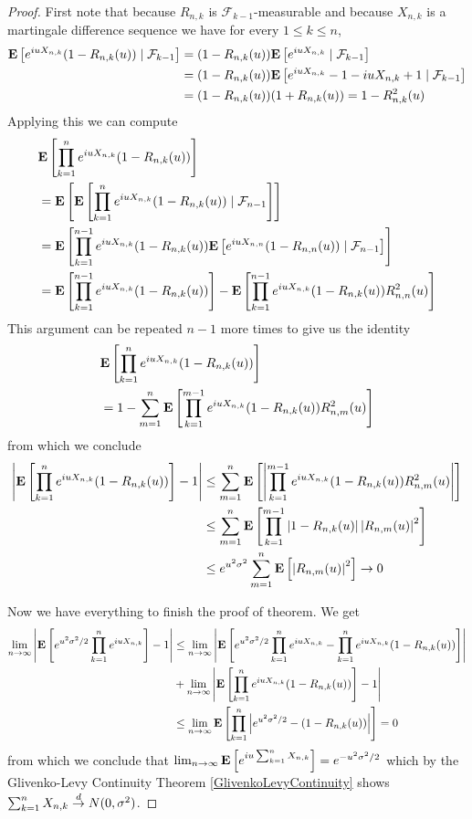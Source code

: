\begin{proof}
First note that because $R_{n,k}$ is $\mathcal{F}_{k-1}$-measurable and because $X_{n,k}$ is a martingale difference sequence we have for every $1 \leq k \leq n$,
\begin{align*}
\cexpectationlong{\mathcal{F}_{k-1}}{e^{iuX_{n,k}} (1 - R_{n,k}(u))} &=
(1 - R_{n,k}(u))\cexpectationlong{\mathcal{F}_{k-1}}{e^{iuX_{n,k}}} \\
&=(1 - R_{n,k}(u))\cexpectationlong{\mathcal{F}_{k-1}}{e^{iuX_{n,k}} -1 -iuX_{n,k} + 1} \\
&= (1 - R_{n,k}(u)) (1 + R_{n,k}(u)) = 1 - R_{n,k}^2(u)
\end{align*}
Applying this we can compute
\begin{align*}
&\expectation{\prod_{k=1}^n e^{iuX_{n,k}} (1 - R_{n,k}(u)) }\\
&=\expectation{\cexpectationlong{\mathcal{F}_{n-1}}{\prod_{k=1}^n e^{iuX_{n,k}} (1 - R_{n,k}(u)) }} \\
&=\expectation{\prod_{k=1}^{n-1} e^{iuX_{n,k}} (1 - R_{n,k}(u))\cexpectationlong{\mathcal{F}_{n-1}}{ e^{iuX_{n,n}} (1 - R_{n,n}(u))}} \\
&=\expectation{\prod_{k=1}^{n-1} e^{iuX_{n,k}} (1 - R_{n,k}(u))} - \expectation{\prod_{k=1}^{n-1} e^{iuX_{n,k}} (1 - R_{n,k}(u)) R^2_{n,n}(u)} 
\end{align*}
This argument can be repeated $n-1$ more times to give us the identity
\begin{align*}
&\expectation{\prod_{k=1}^n e^{iuX_{n,k}} (1 - R_{n,k}(u)) }\\
&=1 - \sum_{m=1}^n \expectation{\prod_{k=1}^{m-1} e^{iuX_{n,k}} (1 - R_{n,k}(u)) R^2_{n,m}(u)} 
\end{align*}
from which we conclude 
\begin{align*}
\abs{\expectation{\prod_{k=1}^n e^{iuX_{n,k}} (1 - R_{n,k}(u)) } - 1} 
&\leq \sum_{m=1}^n \expectation{\abs{\prod_{k=1}^{m-1} e^{iuX_{n,k}} (1 - R_{n,k}(u)) R^2_{n,m}(u)}} \\
&\leq \sum_{m=1}^n \expectation{\prod_{k=1}^{m-1} \abs{ 1 - R_{n,k}(u)} \abs{R_{n,m}(u)}^2}  \\
&\leq e^{u^2\sigma^2} \sum_{m=1}^n \expectation{\abs{R_{n,m}(u)}^2}  \to 0\\
\end{align*}

Now we have everything to finish the proof of theorem.  We get
\begin{align*}
\lim_{n \to \infty} \abs{\expectation{e^{u^2 \sigma^2/2} \prod_{k=1}^n e^{iuX_{n,k}}} -1}  
&\leq \lim_{n \to \infty} \abs{\expectation{e^{u^2 \sigma^2/2} \prod_{k=1}^n e^{iuX_{n,k}} - \prod_{k=1}^n e^{iuX_{n,k}} (1 - R_{n,k}(u))} }  \\
&+\lim_{n \to \infty} \abs{\expectation{\prod_{k=1}^n e^{iuX_{n,k}} (1 - R_{n,k}(u))}-1} \\
&\leq \lim_{n \to \infty} \expectation{ \prod_{k=1}^n \abs{e^{u^2 \sigma^2/2} - (1 - R_{n,k}(u))}} = 0
\end{align*}
from which we conclude that $\lim_{n \to \infty} \expectation{e^{iu\sum_{k=1}^n X_{n,k}}} = e^{-u^2 \sigma^2/2}$ which by
the Glivenko-Levy Continuity Theorem \ref{GlivenkoLevyContinuity} shows $\sum_{k=1}^n X_{n,k} \todist N(0, \sigma^2)$.
\end{proof}

